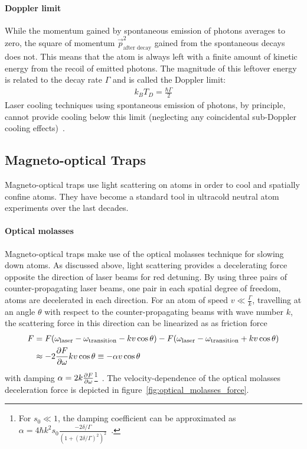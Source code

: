 \paragraph*{Doppler limit} While the momentum gained by spontaneous emission of photons averages to zero, the square of momentum $\vec p_\text{after decay}^2$ gained from the spontaneous decays does not. This means that the atom is always left with a finite amount of kinetic energy from the recoil of emitted photons. The magnitude of this leftover energy is related to the decay rate $\Gamma$ and is called the Doppler limit:
\begin{align}
    k_B T_D = \frac{\hbar \Gamma}{2}
\end{align}
Laser cooling techniques using spontaneous emission of photons, by principle, cannot provide cooling below this limit (neglecting any coincidental sub-Doppler cooling effects)~\cite{foot_atomic_2005}.


\subsection*{Magneto-optical Traps}
Magneto-optical traps use light scattering on atoms in order to cool and spatially confine atoms. They have become a standard tool in ultracold neutral atom experiments over the last decades.

\paragraph{Optical molasses} Magneto-optical traps make use of the optical molasses technique for slowing down atoms. As discussed above, light scattering provides a decelerating force opposite the direction of laser beams for red detuning. By using three pairs of counter-propagating laser beams, one pair in each spatial degree of freedom, atoms are decelerated in each direction. For an atom of speed $v \ll \frac{\Gamma}{k}$, travelling at an angle $\theta$ with respect to the  counter-propagating beams with wave number $k$, the scattering force in this direction can be linearized as as friction force
\begin{equation}
    \begin{split}
        F &= F(\omega_\text{laser} - \omega_\text{transition} - kv \cos \theta) - F(\omega_\text{laser} - \omega_\text{transition} + kv \cos \theta) \\
        &\approx - 2 \pdv{F}{\omega} k v \cos \theta \equiv -\alpha v \cos \theta
    \end{split}
\end{equation}
with damping $\alpha = 2k \pdv{F}{\omega}$\footnote{For $s_0 \ll 1$, the damping coefficient can be approximated as $\alpha  = 4 \hbar k^2 s_0 \frac{-2\delta/\Gamma}{{\left(1+{{(2\delta/\Gamma)}}^2\right)}^2}$~\cite{foot_atomic_2005}.}~\cite{foot_atomic_2005}. The velocity-dependence of the optical molasses deceleration force is depicted in figure~\ref{fig:optical_molasses_force}.

